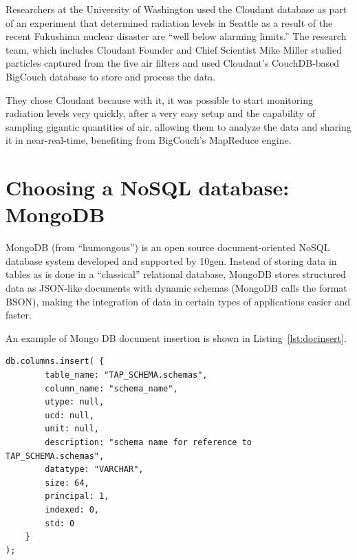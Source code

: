Researchers at the University of Washington used the Cloudant  database as part of an experiment that determined radiation levels in Seattle as a result of the recent Fukushima nuclear disaster are ``well below alarming limits.'' The research team, which includes Cloudant Founder and Chief Scientist Mike Miller studied particles captured from the five air filters and used Cloudant’s CouchDB-based BigCouch database to store and process the data.

They chose Cloudant because with it, it was possible to start monitoring radiation levels very quickly, after a very easy setup and the capability of sampling gigantic quantities of air, allowing them to analyze the data and sharing it in near-real-time,
benefiting from BigCouch's MapReduce engine.





\section{Choosing a NoSQL database: MongoDB} %
\label{sec:mongodb_a_document_oriented_database}

MongoDB (from ``humongous'') is an open source document-oriented
NoSQL
database system developed and supported by 10gen.
Instead of storing data in tables as is done in a ``classical'' relational database, MongoDB stores structured data as JSON-like documents with dynamic schemas (MongoDB calls the format BSON), making the integration of data in certain types of applications easier and faster. 

An example of Mongo DB document insertion is shown in Listing~\ref{lst:docinsert}.

\begin{lstlisting}[float,label=lst:docinsert,caption=MongoDB column insertion example in JSON]
db.columns.insert( {
		table_name: "TAP_SCHEMA.schemas",
		column_name: "schema_name",
		utype: null,
		ucd: null,
		unit: null,
		description: "schema name for reference to TAP_SCHEMA.schemas",
		datatype: "VARCHAR",
		size: 64,
		principal: 1,
		indexed: 0,
		std: 0
	}
);
\end{lstlisting} 


